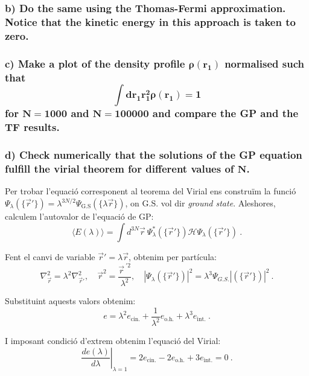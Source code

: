 \documentclass[a4paper]{article}
\begin{document}
\subsubsection*{b) Do the same using the Thomas-Fermi approximation. Notice that the kinetic energy in this approach is taken to zero.}


\subsubsection*{c) Make a plot of the density profile $\boldsymbol{\rho (r_1)}$ normalised such that \begin{equation}
 \boldsymbol{\int dr_1 r_1^2 \rho(r_1)=1}
\end{equation} for $\mathbf{N=1000}$ and $\mathbf{N=100000}$ and compare the GP and the TF results.}


\subsubsection*{d) Check numerically that the solutions of the GP equation fulfill the virial theorem for different values of $\mathbf{N}$.}

Per trobar l'equació corresponent al teorema del Virial ens construïm la funció $\Psi_{\lambda}(\{\vec r'\})=\lambda^{3N/2}\Psi_{\text{G.S}}(\{\lambda\vec r\})$, on G.S. vol dir \textit{ground state}. Aleshores, calculem l'autovalor de l'equació de GP:
\begin{equation}
    \langle E(\lambda)\rangle=\int d^{3N}\vec r \ \Psi_{\lambda}^{*}(\{\vec r'\})\mathcal{H} \Psi_{\lambda}(\{\vec r'\}) \ .
\end{equation}

Fent el canvi de variable $\vec r'= \lambda\vec r$, obtenim per partícula: 
\begin{equation}
    \nabla^2_{\vec r}=\lambda^2\nabla^2_{\vec r'}, \quad \vec r^2=\dfrac{{\vec r}^{\ '2}}{\lambda^2}, \quad |\Psi_{\lambda}(\{\vec r'\})|^2=\lambda^3\Psi_{G.S.}|(\{\vec r'\})|^2 \ .
\end{equation}

Substituint aquests valors obtenim:
\begin{equation}
    e= \lambda^2 e_{\text{cin.}}+\dfrac{1}{\lambda^2}e_{\text{o.h.}}+\lambda^3 e_{\text{int.}}\ .
\end{equation}

I imposant condició d'extrem obtenim l'equació del Virial:
\begin{equation}
    \left.\dfrac{de(\lambda)}{d\lambda}\right\vert_{\lambda=1}=2e_{\text{cin.}}-2e_{\text{o.h.}}+3 e_{\text{int.}}=0\ .
\label{eq:Virial}
\end{equation}
\end{document}
